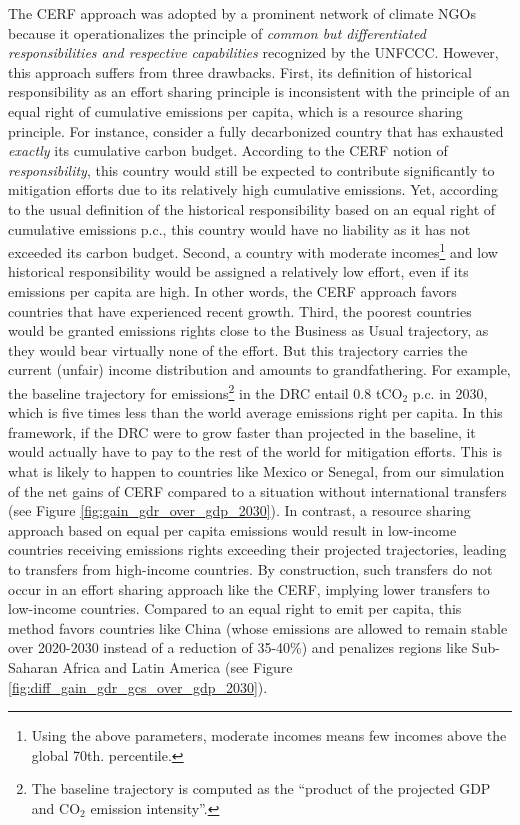 \documentclass[12pt,english]{article}
\begin{document}
The CERF %
approach was adopted by a prominent network of climate NGOs because it operationalizes the principle of \textit{common but differentiated responsibilities and respective capabilities} recognized by the UNFCCC. However, this approach suffers from three drawbacks. %
First, its definition of historical responsibility as an effort sharing principle is inconsistent with the principle of an equal right of cumulative emissions per capita, which is a resource sharing principle. For instance, consider a fully decarbonized country that has exhausted \textit{exactly} its cumulative carbon budget. According to the CERF notion of \textit{responsibility}, this country would still be expected to contribute significantly to mitigation efforts due to its relatively high cumulative emissions. Yet, according to the usual definition of the historical responsibility based on an equal right of cumulative emissions p.c., this country would have no liability as it has not exceeded its carbon budget. 
Second, a country with moderate incomes\footnote{Using the above parameters, moderate incomes means few incomes above the global 70th. percentile.} and low historical responsibility would be assigned a relatively low effort, even if its emissions per capita are high. In other words, the CERF %
approach favors countries that have experienced recent growth. %
Third, the poorest countries would be granted emissions rights close to the Business as Usual trajectory, as they would bear virtually none of the effort. But this trajectory carries the current (unfair) income distribution and amounts to grandfathering. For example, the baseline trajectory for emissions\footnote{The baseline trajectory is computed as the ``product of the projected GDP and CO$_\text{2}$ emission intensity''.} in the DRC entail 0.8 tCO$_\text{2}$ p.c. in 2030, %
which is five times less than the world average emissions right per capita. In this framework, if the DRC were to grow faster than projected in the baseline, it would actually have to pay to the rest of the world for mitigation efforts. This is what is likely to happen to countries like Mexico or Senegal, from our simulation of the net gains of CERF compared to a situation without international transfers (see Figure \ref{fig:gain_gdr_over_gdp_2030}). 
In contrast, a resource sharing approach based on equal per capita emissions would result in low-income countries receiving emissions rights exceeding their projected trajectories, leading to transfers from high-income countries. By construction, such transfers do not occur in an effort sharing approach like the CERF, implying lower transfers to low-income countries. %
Compared to an equal right to emit per capita, this method favors countries like China (whose emissions are allowed to remain stable over 2020-2030 instead of a reduction of 35-40\%) and penalizes regions like Sub-Saharan Africa and Latin America (see Figure \ref{fig:diff_gain_gdr_gcs_over_gdp_2030}). 
\end{document}
